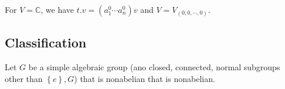 \begin{example}

\begin{example}

For \(V = {\mathbb{C}}\), we have \(t.v = (a_1^0 \cdots a_n^0)v\) and
\(V = V_{(0, 0, \cdots, 0)}\).

\end{example}

\end{example}

\hypertarget{classification}{%
\subsection{Classification}\label{classification}}

Let \(G\) be a simple algebraic group (ano closed, connected, normal
subgroups other than \(\left\{{e}\right\}, G\)) that is nonabelian that
is nonabelian.

